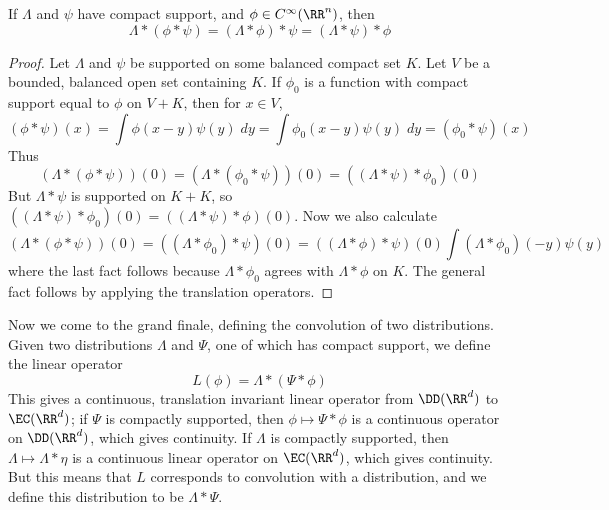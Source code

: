 \begin{theorem}
    If $\Lambda$ and $\psi$ have compact support, and $\phi \in C^\infty(\RR^n)$, then
    \[ \Lambda * (\phi * \psi) = (\Lambda * \phi) * \psi = (\Lambda * \psi) * \phi \]
\end{theorem}
\begin{proof}
    Let $\Lambda$ and $\psi$ be supported on some balanced compact set $K$. Let $V$ be a bounded, balanced open set containing $K$. If $\phi_0$ is a function with compact support equal to $\phi$ on $V + K$, then for $x \in V$,
    \[ (\phi * \psi)(x) = \int \phi(x - y) \psi(y)\; dy = \int \phi_0(x - y) \psi(y)\; dy = (\phi_0 * \psi)(x) \]
    Thus
    \[ (\Lambda * (\phi * \psi))(0) = (\Lambda * (\phi_0 * \psi))(0) = ((\Lambda * \psi) * \phi_0)(0) \]
    But $\Lambda * \psi$ is supported on $K + K$, so $((\Lambda * \psi) * \phi_0)(0) = ((\Lambda * \psi) * \phi)(0)$. Now we also calculate
    \[ (\Lambda * (\phi * \psi))(0) = ((\Lambda * \phi_0) * \psi)(0) = ((\Lambda * \phi) * \psi)(0) \int (\Lambda * \phi_0)(-y) \psi(y) \]
    where the last fact follows because $\Lambda * \phi_0$ agrees with $\Lambda * \phi$ on $K$. The general fact follows by applying the translation operators.
\end{proof}

Now we come to the grand finale, defining the convolution of two distributions. Given two distributions $\Lambda$ and $\Psi$, one of which has compact support, we define the linear operator
%
\[ L(\phi) = \Lambda * (\Psi * \phi) \]
%
This gives a continuous, translation invariant linear operator from $\DD(\RR^d)$ to $\EC(\RR^d)$; if $\Psi$ is compactly supported, then $\phi \mapsto \Psi * \phi$ is a continuous operator on $\DD(\RR^d)$, which gives continuity. If $\Lambda$ is compactly supported, then $\Lambda \mapsto \Lambda * \eta$ is a continuous linear operator on $\EC(\RR^d)$, which gives continuity. But this means that $L$ corresponds to convolution with a distribution, and we define this distribution to be $\Lambda * \Psi$.

